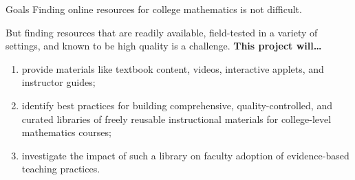 \begin{sectionblock}{Goals}
  Finding online resources for college
  mathematics is not difficult.

  \vspace{1ex}
  But finding resources that are readily available, field-tested in a
  variety of settings, and known to be high quality is a
  challenge. \textbf{This project will\ldots}
  \begin{enumerate}
  \item provide materials like textbook
    content, videos, interactive applets, and instructor guides;
  \item identify best practices for building comprehensive,
    quality-controlled, and curated libraries of freely reusable
    instructional materials for college-level mathematics courses;
  \item investigate the impact of such a library on faculty adoption of
    evidence-based teaching practices.
  \end{enumerate}
\end{sectionblock}



